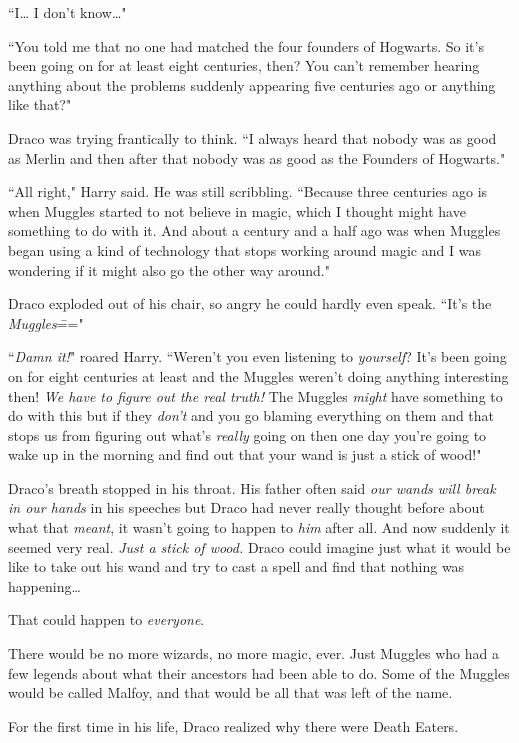 ``I{\ldots} I don't know{\ldots}"

``You told me that no one had matched the four founders of Hogwarts. So it's been going on for at least eight centuries, then? You can't remember hearing anything about the problems suddenly appearing five centuries ago or anything like that?"

Draco was trying frantically to think. ``I always heard that nobody was as good as Merlin and then after that nobody was as good as the Founders of Hogwarts."

``All right," Harry said. He was still scribbling. ``Because three centuries ago is when Muggles started to not believe in magic, which I thought might have something to do with it. And about a century and a half ago was when Muggles began using a kind of technology that stops working around magic and I was wondering if it might also go the other way around."

Draco exploded out of his chair, so angry he could hardly even speak. ``It's the \emph{Muggles}\==="

``\emph{Damn it!}" roared Harry. ``Weren't you even listening to \emph{yourself}? It's been going on for eight centuries at least and the Muggles weren't doing anything interesting then! \emph{We have to figure out the real truth!} The Muggles \emph{might} have something to do with this but if they \emph{don't} and you go blaming everything on them and that stops us from figuring out what's \emph{really} going on then one day you're going to wake up in the morning and find out that your wand is just a stick of wood!"

Draco's breath stopped in his throat. His father often said \emph{our wands will break in our hands} in his speeches but Draco had never really thought before about what that \emph{meant}, it wasn't going to happen to \emph{him} after all. And now suddenly it seemed very real. \emph{Just a stick of wood.} Draco could imagine just what it would be like to take out his wand and try to cast a spell and find that nothing was happening{\ldots}

That could happen to \emph{everyone}.

There would be no more wizards, no more magic, ever. Just Muggles who had a few legends about what their ancestors had been able to do. Some of the Muggles would be called Malfoy, and that would be all that was left of the name.

For the first time in his life, Draco realized why there were Death Eaters.

